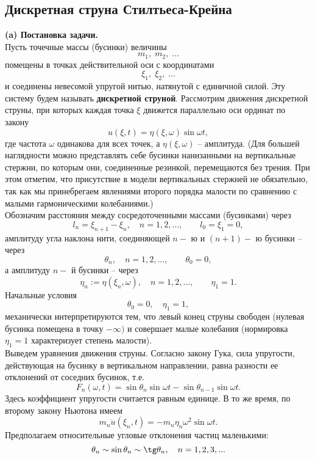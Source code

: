 \documentclass[12 pt, a4 paper]{article}
\theoremstyle{plain}   \newtheorem{Pro}{Задача}
\begin{document}
\subsection{Дискретная струна Стилтьеса-Крейна}
{\bfseries (a) Постановка задачи.} \\

Пусть точечные массы (бусинки) величины
$$
  m_1 , \; m_2 , \; ...
$$
помещены в точках действительной оси с координатами
$$
  \xi _1 , \; \xi _2 , \; ...
$$
и соединены невесомой упругой нитью, натянутой с единичной силой.
Эту систему будем называть
{\bfseries дискретной струной}.
Рассмотрим движения дискретной струны, при которых каждая точка
$ \xi $
движется параллельно оси ординат по закону
$$
  u(\xi ,t)=\eta (\xi , \omega )\sin \omega t ,
$$
где частота
$ \omega $
одинакова для всех точек, а
$ \eta (\xi ,\omega ) $
-- амплитуда.
(Для большей наглядности можно представлять себе бусинки
нанизанными на вертикальные стержни, по которым они,
соединенные резинкой, перемещаются без трения.
При этом отметим, что присутствие в модели вертикальных
стержней не обязательно, так как мы принебрегаем явлениями
второго порядка малости по сравнению с малыми
гармоническими колебаниями.)\\
Обозначим расстояния между сосредоточенными массами (бусинками)
через
$$
  l_n =\xi _{n+1}-\xi _n ,
    \quad n=1,2,..., \qquad
	  l_0 =\xi _1 =0,
$$
амплитуду угла наклона нити, соединяющей
$ n- $
ю и
$ (n+1)- $
ю бусинки -- через
$$
  \theta _n , \quad n=1,2,..., \qquad \theta _0 =0,
$$
а амплитуду
$ n- $
й бусинки -- через
$$
  \eta _n :=\eta (\xi _n ,\omega ),
    \quad n=1,2,..., \qquad \eta _1 =1.
$$
Начальные условия
$$
  \theta _0 =0, \quad \eta _1 =1,
$$
механически интерпретируются тем, что левый конец струны
свободен (нулевая бусинка помещена в точку
$ -\infty ) $
и совершает малые колебания (нормировка
$ \eta _1 =1 $
характеризует степень малости). \\
Выведем уравнения движения струны.
Согласно закону Гука, сила упругости, действующая
на бусинку в вертикальном направлении, равна
разности ее отклонений от соседних бусинок, т.е.
$$
  F_n (\omega ,t)=\sin \theta _n \sin \omega t-
    \sin \theta _{n-1}\sin \omega t.
$$
Здесь коэффициент упругости считается равным единице.
В то же время, по второму закону Ньютона имеем
$$
  m_n \ddot u(\xi _n ,t)=-m_n \eta _n \omega ^2 \sin \omega t.
$$
Предполагаем относительные угловые отклонения частиц
маленькими:
$$
  \theta _n \sim \sin \theta _n \sim \tg \theta _n ,
    \quad n=1,2,3,...
$$
\end{document}
